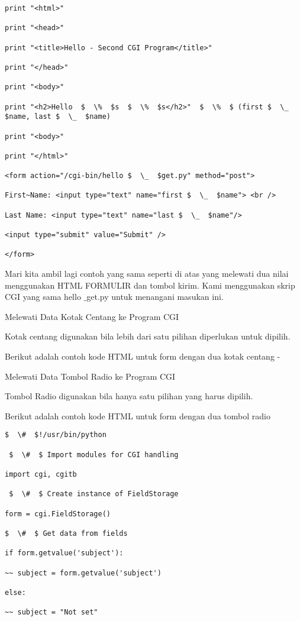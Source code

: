 \begin {enumerate}
\begin {enumerate}
\begin{verbatim}
print "<html>"

print "<head>"

print "<title>Hello - Second CGI Program</title>"

print "</head>"

print "<body>"

print "<h2>Hello  $  \%  $s  $  \%  $s</h2>"  $  \%  $ (first $  \_  $name, last $  \_  $name)

print "<body>"

print "</html>"

<form action="/cgi-bin/hello $  \_  $get.py" method="post">

First~Name: <input type="text" name="first $  \_  $name"> <br />

Last Name: <input type="text" name="last $  \_  $name"/>

<input type="submit" value="Submit" />

</form>

\end{verbatim}
Mari kita ambil lagi contoh yang sama seperti di atas yang melewati dua nilai menggunakan HTML FORMULIR dan tombol kirim. Kami menggunakan skrip CGI yang sama hello $  \_  $get.py untuk menangani masukan ini.

Melewati Data Kotak Centang ke Program CGI

Kotak centang digunakan bila lebih dari satu pilihan diperlukan untuk dipilih.

Berikut adalah contoh kode HTML untuk form dengan dua kotak centang -

Melewati Data Tombol Radio ke Program CGI

Tombol Radio digunakan bila hanya satu pilihan yang harus dipilih.

Berikut adalah contoh kode HTML untuk form dengan dua tombol radio
\begin{verbatim}
$  \#  $!/usr/bin/python

 $  \#  $ Import modules for CGI handling

import cgi, cgitb

 $  \#  $ Create instance of FieldStorage

form = cgi.FieldStorage()

$  \#  $ Get data from fields

if form.getvalue('subject'):

~~ subject = form.getvalue('subject')

else:

~~ subject = "Not set"


\end{verbatim}
\end{enumerate}
\end{enumerate}
